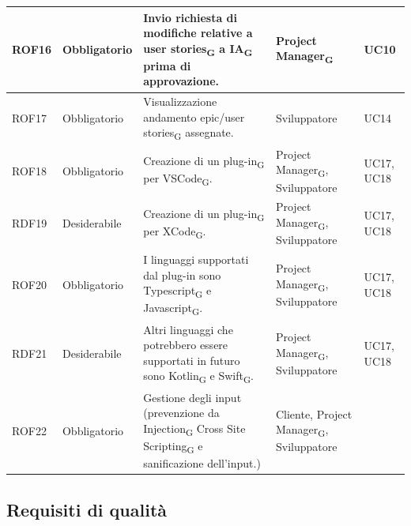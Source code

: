 \documentclass{article}
\begin{document}
\begin{center}
\begin{tabular}{|p{2cm}|p{3cm}|p{6cm}|p{3cm}|p{2cm}|}
ROF16&Obbligatorio & Invio richiesta di modifiche relative a user stories\textsubscript{G} a IA\textsubscript{G} prima di approvazione. & Project Manager\textsubscript{G}& UC10\\
\hline
\rowcolor{LighterBlue}

ROF17&Obbligatorio & Visualizzazione andamento epic/user stories\textsubscript{G} assegnate.& Sviluppatore& UC14\\

\hline

\rowcolor{LightBlue}
ROF18&Obbligatorio & Creazione di un plug-in\textsubscript{G} per VSCode\textsubscript{G}.& Project Manager\textsubscript{G}, Sviluppatore& UC17, UC18\\
\hline
\rowcolor{LighterBlue}
RDF19&Desiderabile & Creazione di un plug-in\textsubscript{G} per XCode\textsubscript{G}.& Project Manager\textsubscript{G}, Sviluppatore& UC17, UC18\\
\hline
\rowcolor{LightBlue}
ROF20&Obbligatorio & I linguaggi supportati dal plug-in sono Typescript\textsubscript{G} e Javascript\textsubscript{G}. & Project Manager\textsubscript{G}, Sviluppatore &UC17, UC18\\
\hline
\rowcolor{LighterBlue}
RDF21&Desiderabile & Altri linguaggi che potrebbero essere supportati in futuro sono Kotlin\textsubscript{G} e Swift\textsubscript{G}.& Project Manager\textsubscript{G}, Sviluppatore &UC17, UC18\\
\hline
\rowcolor{LightBlue}
ROF22 & Obbligatorio & Gestione degli input (prevenzione da Injection\textsubscript{G} Cross Site Scripting\textsubscript{G} e sanificazione dell'input.) & Cliente, Project Manager\textsubscript{G}, Sviluppatore & \\
\hline

\end{tabular}
\label{tab:reqfunz}
\end{center}

\subsection{Requisiti di qualità}
\end{document}
